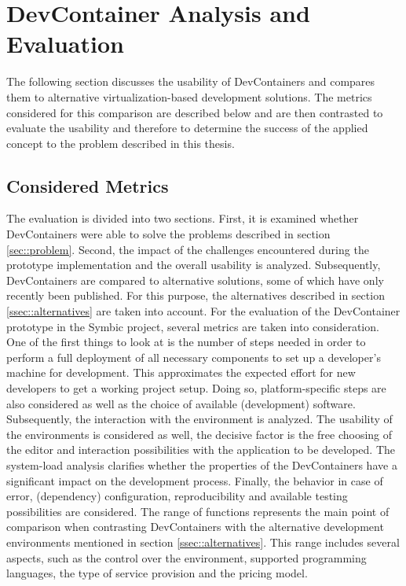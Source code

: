
\section{DevContainer Analysis and Evaluation}\label{sec::eval}
The following section discusses the usability of DevContainers and compares them to alternative virtualization-based development solutions. The metrics considered for this comparison are described below and are then contrasted to evaluate the usability and therefore to determine the success of the applied concept to the problem described in this thesis.

    \subsection{Considered Metrics}
    The evaluation is divided into two sections. First, it is examined whether DevContainers were able to solve the problems described in section \ref{sec::problem}. Second, the impact of the challenges encountered during the prototype implementation and the overall usability is analyzed. Subsequently, DevContainers are compared to alternative solutions, some of which have only recently been published. For this purpose, the alternatives described in section \ref{ssec::alternatives} are taken into account.\newline
    For the evaluation of the DevContainer prototype in the Symbic project, several metrics are taken into consideration. One of the first things to look at is the number of steps needed in order to perform a full deployment of all necessary components to set up a developer's machine for development. This approximates the expected effort for new developers to get a working project setup. Doing so, platform-specific steps are also considered as well as the choice of available (development) software. Subsequently, the interaction with the environment is analyzed. The usability of the environments is considered as well, the decisive factor is the free choosing of the editor and interaction possibilities with the application to be developed. The system-load analysis clarifies whether the properties of the DevContainers have a significant impact on the development process. Finally, the behavior in case of error, (dependency) configuration, reproducibility and available testing possibilities are considered. \newline
    The range of functions represents the main point of comparison when contrasting DevContainers with the alternative development environments mentioned in section \ref{ssec::alternatives}. This range includes several aspects, such as the control over the environment, supported programming languages, the type of service provision and the pricing model.

